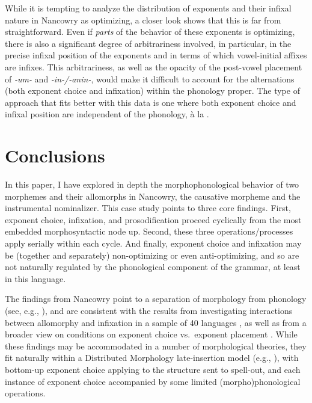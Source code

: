 \documentclass[output=paper,colorlinks,citecolor=brown,
]{langscibook}
\begin{document}
While it is tempting to analyze the distribution of exponents and their infixal nature in Nancowry as optimizing, a closer look shows that this is far from straightforward. Even if {\it parts} of the behavior of these exponents is optimizing, there is also a significant degree of arbitrariness involved, in particular, in the precise infixal position of the exponents and in terms of which vowel-initial affixes are infixes. This arbitrariness, as well as the opacity of the post-vowel placement of \textit{-um-} and \textit{-in-/-anin-}, would make it difficult to account for the alternations (both exponent choice and infixation) within the phonology proper. The type of approach that fits better with this data is one where both exponent choice and infixal position are  independent of the phonology, \`a la \citealt{Paster06,Yu07,KalinIP,Kalin20,KalinRolle21}.%

\section{Conclusions}

In this paper, I have explored in depth the morphophonological behavior of two morphemes and their allomorphs in Nancowry, the causative morpheme and the instrumental nominalizer. This case study points to three core findings. First, exponent choice, infixation, and prosodification proceed cyclically from the most embedded morphosyntactic node up. Second, these three operations/processes apply serially within each cycle. And finally, exponent choice and infixation may be (together and separately) non-optimizing or even anti-optimizing, and so are not naturally regulated by the phonological component of the grammar, at least in this language.

The findings from Nancowry point to a separation of morphology from phonology (see, e.g.,  \citealt{Trommer01,Paster06,Yu07,Embick10,BS12,Pak16,Dawson17,Kalin20,Rolle20,Stanton20}), and are consistent with the results from investigating interactions between allomorphy and infixation in a sample of 40 languages \citep{KalinIP}, as well as from a broader view on conditions on exponent choice vs.\ exponent placement \citep{KalinRolle21}. While these findings may be accommodated in a number of morphological theories, they fit naturally within a Distributed Morphology late-insertion model (e.g., \citealt{HalleMarantz93,HalleMarantz94,Embick10}), with bottom-up exponent choice applying to the structure sent to spell-out, and each instance of exponent choice accompanied by some limited (morpho)phonological operations.
\end{document}

